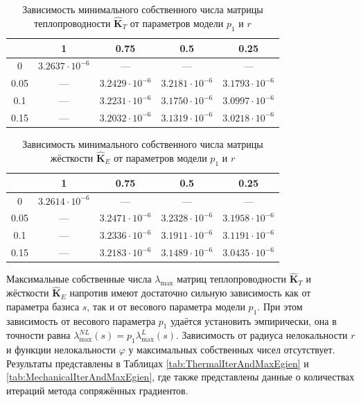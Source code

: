 \begin{table}[htbp]
    \centering
    \begin{threeparttable}%
        \caption{Зависимость минимального собственного числа матрицы теплопроводности $\widehat{\textbf{K}}_T$ от параметров модели $p_1$ и $r$}\label{tab:ThermalEigenMin}
        \begin{tabular}{|c|c|c|c|c|}
			\hline
			\backslashbox{$r$}{$p_1$} & 1 & 0.75 & 0.5 & 0.25 \\
			\hline
			0    & $3.2637 \cdot 10^{-6}$ & --- & --- & --- \\
			\hline
			0.05 & --- & $3.2429 \cdot 10^{-6}$ & $3.2181 \cdot 10^{-6}$ & $3.1793 \cdot 10^{-6}$ \\
			\hline
			0.1  & --- & $3.2231 \cdot 10^{-6}$ & $3.1750 \cdot 10^{-6}$ & $3.0997 \cdot 10^{-6}$ \\
			\hline
			0.15 & --- & $3.2032 \cdot 10^{-6}$ & $3.1319 \cdot 10^{-6}$ & $3.0218 \cdot 10^{-6}$ \\
			\hline
        \end{tabular}
    \end{threeparttable}
\end{table}

\begin{table}[htbp]
    \centering
    \begin{threeparttable}%
        \caption{Зависимость минимального собственного числа матрицы жёсткости $\widehat{\textbf{K}}_E$ от параметров модели $p_1$ и $r$}\label{tab:StressEigenMin}
        \begin{tabular}{|c|c|c|c|c|}
			\hline
			\backslashbox{$r$}{$p_1$} & 1 & 0.75 & 0.5 & 0.25 \\
			\hline
			0    & $3.2614 \cdot 10^{-6}$ & --- & --- & --- \\
			\hline
			0.05 & --- & $3.2471 \cdot 10^{-6}$ & $3.2328 \cdot 10^{-6}$ & $3.1958 \cdot 10^{-6}$ \\
			\hline
			0.1  & --- & $3.2336 \cdot 10^{-6}$ & $3.1911 \cdot 10^{-6}$ & $3.1191 \cdot 10^{-6}$ \\
			\hline
			0.15 & --- & $3.2183 \cdot 10^{-6}$ & $3.1489 \cdot 10^{-6}$ & $3.0435 \cdot 10^{-6}$ \\
			\hline
        \end{tabular}
    \end{threeparttable}
\end{table}

Максимальные собственные числа $\lambda_{\max}$ матриц теплопроводности $\widehat{\textbf{K}}_T$ и жёсткости $\widehat{\textbf{K}}_E$ напротив имеют достаточно сильную зависимость как от параметра базиса $s$, так и от весового параметра модели $p_1$. При этом зависимость от весового параметра $p_1$ удаётся установить эмпирически, она в точности равна $\lambda_{\max}^{NL}(s) = p_1 \lambda_{\max}^{L}(s)$. Зависимость от радиуса нелокальности $r$ и функции нелокальности $\varphi$ у максимальных собственных чисел отсутствует. Результаты представлены в Таблицах \ref{tab:ThermalIterAndMaxEgien} и \ref{tab:MechanicalIterAndMaxEgien}, где также представлены данные о количествах итераций метода сопряжённых градиентов.

